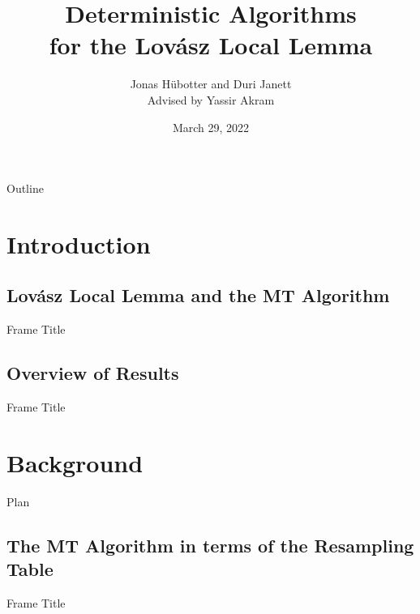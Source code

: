 \documentclass{beamer}
\begin{document}
\title[Deterministic Algorithms for the Lovász Local Lemma]{Deterministic Algorithms \\ for the Lovász Local Lemma}
\author{Jonas Hübotter and Duri Janett \\ Advised by Yassir Akram}
\date{March 29, 2022}

\begin{frame}
  \titlepage
\end{frame}

\begin{frame}{Outline}
 \tableofcontents[subsubsectionstyle=hide,pausesections]
\end{frame}

\section{Introduction}
\subsection{Lovász Local Lemma and the MT Algorithm}
\begin{frame}{Frame Title}
    
\end{frame}
\subsection{Overview of Results}
\begin{frame}{Frame Title}
    
\end{frame}

\section{Background}
\begin{frame}{Plan}
\tableofcontents[currentsection, sectionstyle=show/shaded, hideothersubsections]
\end{frame}
\subsection{The MT Algorithm in terms of the Resampling Table}
\begin{frame}{Frame Title}
    
\end{frame}
\end{document}
